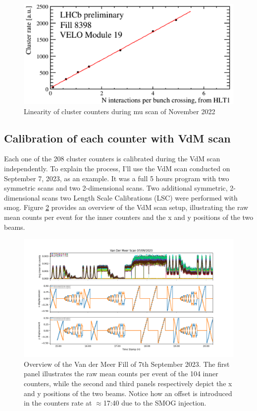 \begin{figure}
    \centering
    \includegraphics[width=\textwidth]{figures/muscan.png}
    \caption{Linearity of cluster counters during mu scan of November 2022}
    \label{fig:muscan}
\end{figure}


\subsection{Calibration of each counter with VdM scan}
Each one of the 208 cluster counters is calibrated during the VdM scan independently. To explain the process, I'll use the VdM scan conducted on September 7, 2023, as an example.
It was a full 5 hours program with two symmetric scans and two 2-dimensional scans. Two additional symmetric, 2-dimensional scans two Length Scale Calibrations (LSC) were performed with smog. Figure \ref{fig:inner_vdm_sep} provides an overview of the VdM scan setup, illustrating the raw mean counts per event for the inner counters and the x and y positions of the two beams.



\begin{figure}
    \centering
    \includegraphics[width=\textwidth]{figures/inner_counts_bkg.png}
    \caption{Overview of the Van der Meer Fill of 7th September 2023. The first panel illustrates the raw mean counts per event of the 104 inner counters, while the second and third panels respectively depict the x and y positions of the two beams. Notice how an offset is introduced in the counters rate at $\approx$17:40 due to the SMOG injection.}
    \label{fig:inner_vdm_sep}
\end{figure}


